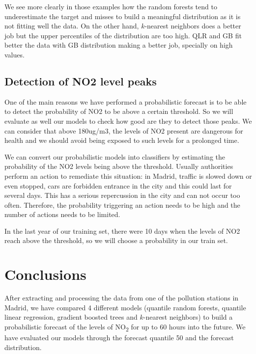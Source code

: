 \documentclass[a4paper,twocolumn,5p]{elsarticle}
\begin{document}
We see more clearly in those examples how the random forests tend to
underestimate the target and misses to build a meaningful distribution
as it is not fitting well the data. On the other hand, $k$-nearest
neighbors does a better job but the upper percentiles of the
distribution are too high.  QLR and GB fit better the data with GB
distribution making a better job, specially on high values.


\subsection{Detection of NO2 level peaks}

One of the main reasons we have performed a probabilistic forecast 
is to be able to detect the probability of NO2 to be above a certain 
threshold. So we will evaluate as well our models to check how 
good are they to detect those peaks. 
We can consider that above 180ug/m3, the levels of NO2 present 
are dangerous for health and we should avoid being exposed to 
such levels for a prolonged time. 

We can convert our probabilistic models into classifiers by estimating 
the probability of the NO2 levels being above the threshold. 
Usually authorities perform an action to remediate this situation:
in Madrid, traffic is slowed down or even stopped, cars are forbidden 
entrance in the city and this could last for several days. This has 
a serious repercussion in the city and can not occur too often.
Therefore, the probability triggering an action needs to be high and 
the number of actions needs to be limited.

In the last year of our training set, there were 10 days when the 
levels of NO2 reach above the threshold, so we will choose a probability in 
our train set.



\section{Conclusions}
\label{sec:concl}

After extracting and processing the data from one of the pollution
stations in Madrid, we have compared 4 different models (quantile
random forests, quantile linear regression, gradient boosted trees and
$k$-nearest neighbors) to build a probabilistic forecast of the levels
of NO\textsubscript{2} for up to 60 hours into the future. We have
evaluated our models through the forecast quantile 50 and the forecast
distribution.
\end{document}
